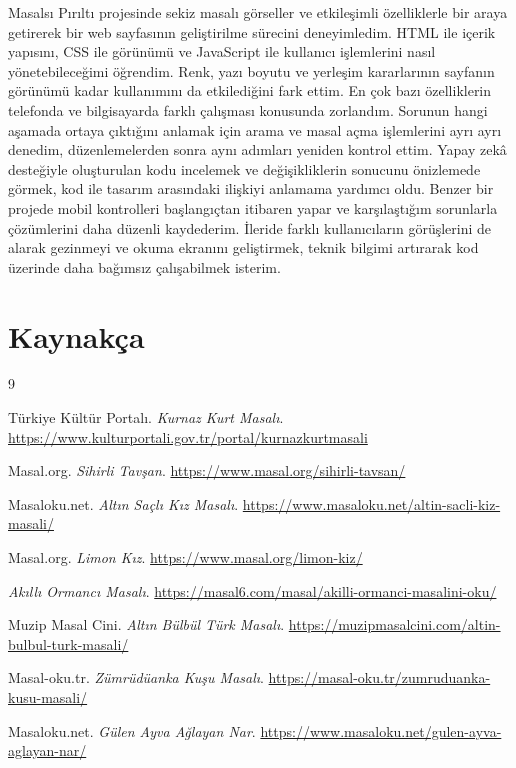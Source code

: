 \documentclass[12pt,a4paper]{article}
\begin{document}
Masalsı Pırıltı projesinde sekiz masalı görseller ve etkileşimli özelliklerle bir araya getirerek bir web sayfasının geliştirilme sürecini deneyimledim. HTML ile içerik yapısını, CSS ile görünümü ve JavaScript ile kullanıcı işlemlerini nasıl yönetebileceğimi öğrendim. Renk, yazı boyutu ve yerleşim kararlarının sayfanın görünümü kadar kullanımını da etkilediğini fark ettim. En çok bazı özelliklerin telefonda ve bilgisayarda farklı çalışması konusunda zorlandım. Sorunun hangi aşamada ortaya çıktığını anlamak için arama ve masal açma işlemlerini ayrı ayrı denedim, düzenlemelerden sonra aynı adımları yeniden kontrol ettim. Yapay zekâ desteğiyle oluşturulan kodu incelemek ve değişikliklerin sonucunu önizlemede görmek, kod ile tasarım arasındaki ilişkiyi anlamama yardımcı oldu. Benzer bir projede mobil kontrolleri başlangıçtan itibaren yapar ve karşılaştığım sorunlarla çözümlerini daha düzenli kaydederim. İleride farklı kullanıcıların görüşlerini de alarak gezinmeyi ve okuma ekranını geliştirmek, teknik bilgimi artırarak kod üzerinde daha bağımsız çalışabilmek isterim.

\section{Kaynakça}



\begin{thebibliography}{9}
\raggedright

Türkiye Kültür Portalı.
\emph{Kurnaz Kurt Masalı}.
\url{https://www.kulturportali.gov.tr/portal/kurnazkurtmasali}

Masal.org.
\emph{Sihirli Tavşan}.
\url{https://www.masal.org/sihirli-tavsan/}

Masaloku.net.
\emph{Altın Saçlı Kız Masalı}.
\url{https://www.masaloku.net/altin-sacli-kiz-masali/}

Masal.org.
\emph{Limon Kız}.
\url{https://www.masal.org/limon-kiz/}


\emph{Akıllı Ormancı Masalı}.
\url{https://masal6.com/masal/akilli-ormanci-masalini-oku/}

Muzip Masal Cini.
\emph{Altın Bülbül Türk Masalı}.
\url{https://muzipmasalcini.com/altin-bulbul-turk-masali/}

Masal-oku.tr.
\emph{Zümrüdüanka Kuşu Masalı}.
\url{https://masal-oku.tr/zumruduanka-kusu-masali/}

Masaloku.net.
\emph{Gülen Ayva Ağlayan Nar}.
\url{https://www.masaloku.net/gulen-ayva-aglayan-nar/}

\end{thebibliography}
\end{document}
